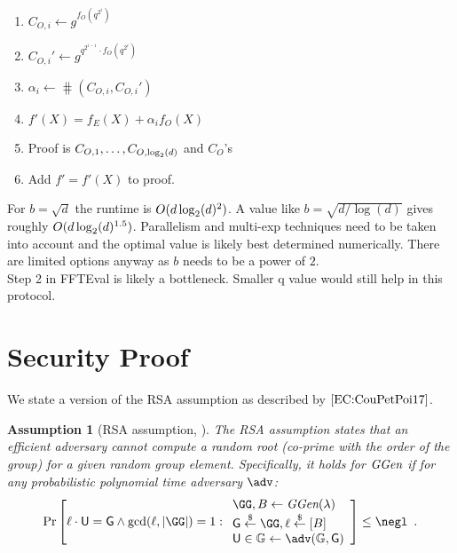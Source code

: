 \documentclass[12pt]{article}
\theoremstyle{Definition}
\newtheorem{assumption}{Assumption}
\begin{document}
\begin{mdframed}
\begin{enumerate}[nolistsep]
		\item \pcind[1] $C_{O,i}\gets g^{f_O(q^{2^i})}$ 
		\item  \pcind[1] $C_{O,i}'\gets g^{q^{2^{i-1}} \cdot f_O(q^{2^i})}$ 
		\item \pcind[1] $\alpha_i\gets\hash(C_{O,i},C_{O,i}')$
		\item \pcind[1] $f'(X)=f_E(X)+\alpha_i f_O(X)$
		\item Proof is $C_{O,1},\dots,C_{O,\log_2(d)}$ and $C_O$'s
		\item Add $f'=f'(X)$ to proof.
	\end{enumerate}
	\end{mdframed}
	For $b=\sqrt{d}$ the runtime is $O(d \log_2(d)^2)$. A value like $b=\sqrt{d/\log(d)}$ gives roughly $O(d\log_2(d)^{1.5})$. Parallelism and multi-exp techniques need to be taken into account and the optimal value is likely best determined numerically. There are limited options anyway as $b$ needs to be a power of $2$.\\ 
Step 2 in FFTEval is likely a bottleneck. Smaller q value would still help in this protocol.
\section{Security Proof}
We state a version of the RSA assumption as described by $\cite{EC:CouPetPoi17}$.
\begin{assumption}[RSA assumption,\cite{RivShaAdl78,EC:CouPetPoi17} ]
	The RSA assumption states that an efficient adversary cannot compute a random root (co-prime with the order of the group) for a given random group element. Specifically, it holds for $\textit{GGen}$ if for any probabilistic polynomial time adversary $\adv$:
	\[
    \Pr\left[\ell \cdot \gr{U} = \Generator \wedge \gcd(\ell,|\GG|)=1:
    \begin{array}{l}
         \GG,B \leftarrow \ggen(\lambda)  \\
         \Generator \sample \GG, \ell \sample [B]  \\
         \gr{U} \in \mathbb{G} \leftarrow \adv(\mathbb{G}, \Generator) \\
    \end{array}\right] \leq \negl \enspace .
\]

\end{assumption}
\end{document}
